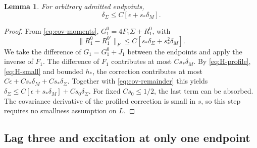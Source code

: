\documentclass[11pt,a4paper]{amsart}
\theoremstyle{plain}
\newtheorem{lemma}[theorem]{Lemma}
\theoremstyle{definition}
\theoremstyle{remark}
\begin{document}
\begin{lemma}\label{lem:pre-cov}
For arbitrary admitted endpoints,
\begin{equation}\label{eq:pre-cov}
 \delta_\Sigma\le C[\epsilon+s_*\delta_M].
\end{equation}
\end{lemma}
\begin{proof}
From \eqref{eq:cov-moments},
$G_1^0=4F_1\Sigma+R_1^0$, with
\begin{equation}\label{eq:cov-remainder}
 \|R_1^0-R_1^{0\prime}\|_F
 \le C[s_*\delta_\Sigma+s_*^2\delta_M].
\end{equation}
We take the difference of $G_1=G_1^0+J_1$ between the endpoints and apply
the inverse of $F_1$.
The difference of $F_1$ contributes at most $Cs_*\delta_M$.
By \eqref{eq:H-profile}, \eqref{eq:H-small} and bounded $h_*$, the
correction contributes at most
$C\epsilon+Cs_*\delta_M+Cs_*\delta_\Sigma$.
Together with \eqref{eq:cov-remainder} this yields
$\delta_\Sigma\le C[\epsilon+s_*\delta_M]+Cs_0\delta_\Sigma$.
For fixed $Cs_0\le1/2$, the last term can be absorbed. The covariance
derivative of the profiled correction is small in $s$, so this step
requires no smallness assumption on $L$.
\end{proof}

\subsection{Lag three and excitation at only one endpoint}
\end{document}
